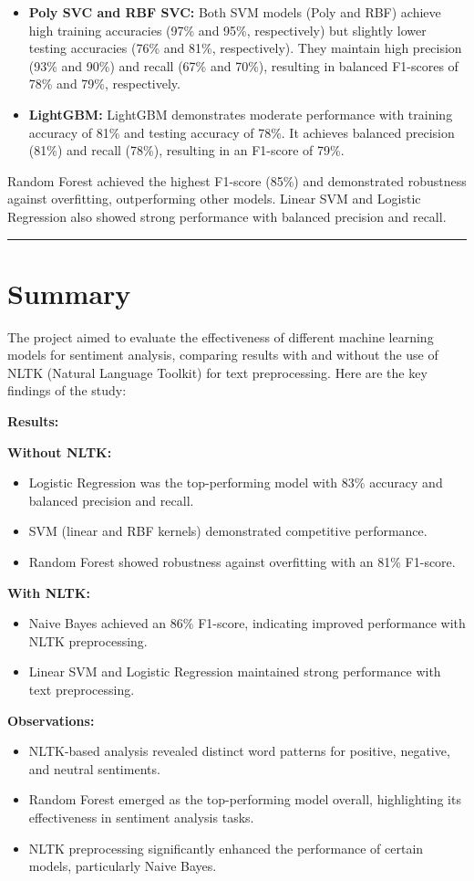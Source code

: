 \documentclass[a4paper]{article}
\theoremstyle{plain}
\theoremstyle{definition}
\begin{document}
\begin{itemize}
  \item \textbf{Poly SVC and RBF SVC:} Both SVM models (Poly and RBF) achieve high training accuracies (97\% and 95\%, respectively) but slightly lower testing accuracies (76\% and 81\%, respectively). They maintain high precision (93\% and 90\%) and recall (67\% and 70\%), resulting in balanced F1-scores of 78\% and 79\%, respectively.
  
  \item \textbf{LightGBM:} LightGBM demonstrates moderate performance with training accuracy of 81\% and testing accuracy of 78\%. It achieves balanced precision (81\%) and recall (78\%), resulting in an F1-score of 79\%.
\end{itemize}
Random Forest achieved the highest F1-score (85\%) and demonstrated robustness against overfitting, outperforming other models. Linear SVM and Logistic Regression also showed strong performance with balanced precision and recall.
\vspace{0.3 cm}
\hrule{}
\section{Summary}
\label{sec:app}

The project aimed to evaluate the effectiveness of different machine learning models for sentiment analysis, comparing results with and without the use of NLTK (Natural Language Toolkit) for text preprocessing. Here are the key findings of the study:

\textbf{Results:}

\textbf{Without NLTK:}
\begin{itemize}
    \item Logistic Regression was the top-performing model with 83\% accuracy and balanced precision and recall.
    \item SVM (linear and RBF kernels) demonstrated competitive performance.
    \item Random Forest showed robustness against overfitting with an 81\% F1-score.
\end{itemize}

\textbf{With NLTK:}
\begin{itemize}
    \item Naive Bayes achieved an 86\% F1-score, indicating improved performance with NLTK preprocessing.
    \item Linear SVM and Logistic Regression maintained strong performance with text preprocessing.
\end{itemize}
\textbf{
Observations:}
\begin{itemize}
    \item NLTK-based analysis revealed distinct word patterns for positive, negative, and neutral sentiments.
    \item Random Forest emerged as the top-performing model overall, highlighting its effectiveness in sentiment analysis tasks.
    \item NLTK preprocessing significantly enhanced the performance of certain models, particularly Naive Bayes.
\end{itemize}
\end{document}
